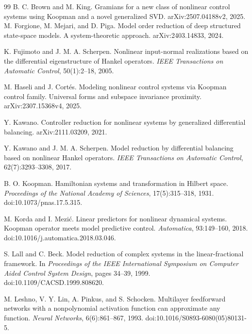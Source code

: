 \documentclass{l4dc2027}
\begin{document}
\begin{thebibliography}{99}
B. C. Brown and M. King.
\newblock Gramians for a new class of nonlinear control systems using Koopman and a novel generalized SVD.
\newblock arXiv:2507.04188v2, 2025.
M. Forgione, M. Mejari, and D. Piga.
\newblock Model order reduction of deep structured state-space models. A system-theoretic approach.
\newblock arXiv:2403.14833, 2024.

K. Fujimoto and J. M. A. Scherpen.
\newblock Nonlinear input-normal realizations based on the differential eigenstructure of Hankel operators.
\newblock \emph{IEEE Transactions on Automatic Control}, 50(1):2--18, 2005.

M. Haseli and J. Cort\'es.
\newblock Modeling nonlinear control systems via Koopman control family. Universal forms and subspace invariance proximity.
\newblock arXiv:2307.15368v4, 2025.

Y. Kawano.
\newblock Controller reduction for nonlinear systems by generalized differential balancing.
\newblock arXiv:2111.03209, 2021.

Y. Kawano and J. M. A. Scherpen.
\newblock Model reduction by differential balancing based on nonlinear Hankel operators.
\newblock \emph{IEEE Transactions on Automatic Control}, 62(7):3293--3308, 2017.

B. O. Koopman.
\newblock Hamiltonian systems and transformation in Hilbert space.
\newblock \emph{Proceedings of the National Academy of Sciences}, 17(5):315--318, 1931.
\newblock doi:10.1073/pnas.17.5.315.

M. Korda and I. Mezi\'c.
\newblock Linear predictors for nonlinear dynamical systems. Koopman operator meets model predictive control.
\newblock \emph{Automatica}, 93:149--160, 2018.
\newblock doi:10.1016/j.automatica.2018.03.046.

S. Lall and C. Beck.
\newblock Model reduction of complex systems in the linear-fractional framework.
\newblock In \emph{Proceedings of the IEEE International Symposium on Computer Aided Control System Design}, pages 34--39, 1999.
\newblock doi:10.1109/CACSD.1999.808620.

M. Leshno, V. Y. Lin, A. Pinkus, and S. Schocken.
\newblock Multilayer feedforward networks with a nonpolynomial activation function can approximate any function.
\newblock \emph{Neural Networks}, 6(6):861--867, 1993.
\newblock doi:10.1016/S0893-6080(05)80131-5.


\end{thebibliography}
\end{document}
